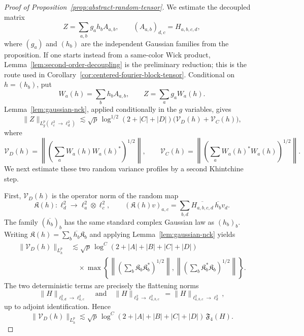 \documentclass[10pt]{amsart}
\numberwithin{equation}{section}
\theoremstyle{plain}
\theoremstyle{definition}
\theoremstyle{remark}
\begin{document}
\begin{proof}[Proof of Proposition~\ref{prop:abstract-random-tensor}]
We estimate the decoupled matrix
\begin{equation}\label{eq:decoupled-tensor-matrix}
        Z=\sum_{a,b}g_ah_bA_{a,b},
        \qquad (A_{a,b})_{d,c}=H_{a,b,c,d},
\end{equation}
where $(g_a)$ and $(h_b)$ are the independent Gaussian families from the proposition.  If one starts instead from a same-color Wick product, Lemma~\ref{lem:second-order-decoupling} is the preliminary reduction; this is the route used in Corollary~\ref{cor:centered-fourier-block-tensor}.  Conditional on $h=(h_b)$, put
\[
        W_a(h)=\sum_bh_bA_{a,b},
        \qquad Z=\sum_ag_aW_a(h).
\]
Lemma~\ref{lem:gaussian-nck}, applied conditionally in the $g$ variables, gives
\begin{equation}\label{eq:first-nck-tensor-proof}
\|Z\|_{L_g^p(\ell^2_c\to\ell^2_d)}
\lesssim
\sqrt p\,\log^{1/2}(2+|C|+|D|)
\bigl(\mathcal V_D(h)+\mathcal V_C(h)\bigr),
\end{equation}
where
\[
\mathcal V_D(h)=\left\|\left(\sum_aW_a(h)W_a(h)^*\right)^{1/2}\right\|,
\qquad
\mathcal V_C(h)=\left\|\left(\sum_aW_a(h)^*W_a(h)\right)^{1/2}\right\|.
\]
We next estimate these two random variance profiles by a second Khintchine step.

First, $\mathcal V_D(h)$ is the operator norm of the random map
\[
\mathfrak K(h):\ell_d^2\to\ell_a^2\otimes\ell_c^2,
\qquad
(\mathfrak K(h)v)_{a,c}=\sum_{b,d}\overline{H_{a,b,c,d}}\,\overline{h_b}v_d.
\]
The family \((\overline{h_b})_b\) has the same standard complex Gaussian law as \((h_b)_b\).  Writing \(\mathfrak K(h)=\sum_b\overline{h_b}\mathfrak K_b\) and applying Lemma~\ref{lem:gaussian-nck} yields
\begin{align*}
\|\mathcal V_D(h)\|_{L_h^p}
&\lesssim
\sqrt p\,\log^C(2+|A|+|B|+|C|+|D|)\\
&\quad\times
\max\left\{
\left\|\left(\sum_b\mathfrak K_b\mathfrak K_b^*\right)^{1/2}\right\|,
\left\|\left(\sum_b\mathfrak K_b^*\mathfrak K_b\right)^{1/2}\right\|
\right\}.
\end{align*}
The two deterministic terms are precisely the flattening norms
\[
        \|H\|_{\ell^2_{b,d}\to\ell^2_{a,c}}
        \quad\text{and}\quad
        \|H\|_{\ell^2_d\to\ell^2_{a,b,c}}
        =\|H\|_{\ell^2_{a,b,c}\to\ell^2_d},
\]
up to adjoint identification.  Hence
\begin{equation}\label{eq:row-var-tensor-proof}
        \|\mathcal V_D(h)\|_{L_h^p}
        \lesssim
        \sqrt p\,\log^C(2+|A|+|B|+|C|+|D|)\,\mathfrak F_4(H).
\end{equation}


\end{proof}
\end{document}
